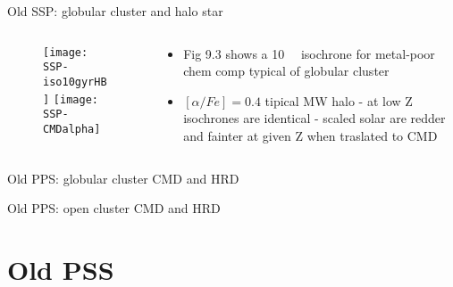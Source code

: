 \begin{frame}{Old SSP: globular cluster and halo star}
\begin{columns}[T]
\begin{column}{0.45\textwidth}
		\begin{figure}[!ht]
		\texttt{[image: SSP-iso10gyrHB]}\label{fig:SSP-iso10gyrHB}
		\texttt{[image: SSP-CMDalpha]}\label{fig:SSP-CMDalpha}
		\end{figure}
\end{column}
\begin{column}{0.45\textwidth}
		\begin{itemize}
		\item Fig 9.3 shows a \SI{10}{\giga\year} isochrone for metal-poor chem comp typical of globular cluster
		\item $[\alpha/Fe]=0.4$ tipical MW halo - at low Z isochrones are identical - scaled solar are redder and fainter at given Z when traslated to CMD
		\end{itemize}
\end{column}
\end{columns}
\end{frame}

\begin{frame}{Old PPS: globular cluster}
CMD and HRD
\end{frame}

\begin{frame}{Old PPS: open cluster}
CMD and HRD
\end{frame}

\section{Old PSS}


